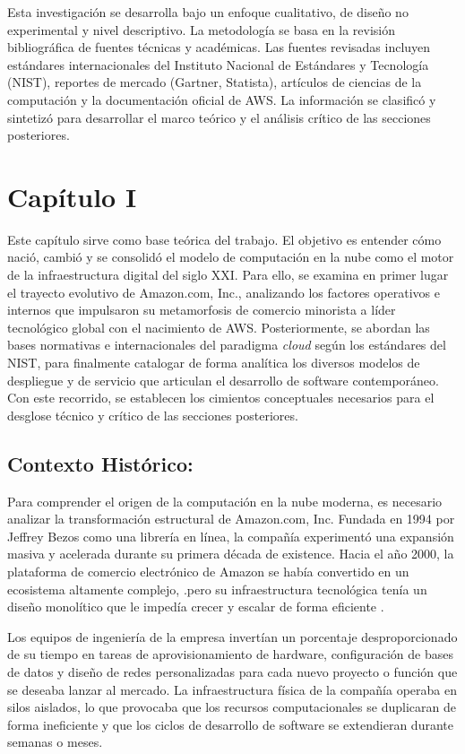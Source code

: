 \documentclass[12pt,a4paper]{article}
\begin{document}
Esta investigación se desarrolla bajo un enfoque cualitativo, de diseño no experimental y nivel descriptivo. La metodología se basa en la revisión bibliográfica de fuentes técnicas y académicas. Las fuentes revisadas incluyen estándares internacionales del Instituto Nacional de Estándares y Tecnología (NIST), reportes de mercado (Gartner, Statista), artículos de ciencias de la computación y la documentación oficial de AWS. La información se clasificó y sintetizó para desarrollar el marco teórico y el análisis crítico de las secciones posteriores.



\section{Capítulo I}

Este capítulo sirve como base teórica del trabajo. El objetivo es entender cómo nació, cambió y se consolidó el modelo de computación en la nube como el motor de la infraestructura digital del siglo XXI. Para ello, se examina en primer lugar el trayecto evolutivo de Amazon.com, Inc., analizando los factores operativos e internos que impulsaron su metamorfosis de comercio minorista a líder tecnológico global con el nacimiento de AWS. Posteriormente, se abordan las bases normativas e internacionales del paradigma \textit{cloud} según los estándares del NIST, para finalmente catalogar de forma analítica los diversos modelos de despliegue y de servicio que articulan el desarrollo de software contemporáneo. Con este recorrido, se establecen los cimientos conceptuales necesarios para el desglose técnico y crítico de las secciones posteriores.

\subsection{Contexto Histórico: }

Para comprender el origen de la computación en la nube moderna, es necesario analizar la transformación estructural de Amazon.com, Inc. Fundada en 1994 por Jeffrey Bezos como una librería en línea, la compañía experimentó una expansión masiva y acelerada durante su primera década de existence. Hacia el año 2000, la plataforma de comercio electrónico de Amazon se había convertido en un ecosistema altamente complejo, .pero su infraestructura tecnológica tenía un diseño monolítico que le impedía crecer y escalar de forma eficiente \parencite{varia2014}. 

Los equipos de ingeniería de la empresa invertían un porcentaje desproporcionado de su tiempo en tareas de aprovisionamiento de hardware, configuración de bases de datos y diseño de redes personalizadas para cada nuevo proyecto o función que se deseaba lanzar al mercado. La infraestructura física de la compañía operaba en silos aislados, lo que provocaba que los recursos computacionales se duplicaran de forma ineficiente y que los ciclos de desarrollo de software se extendieran durante semanas o meses. 
\end{document}
